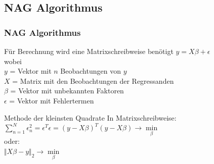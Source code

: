 \documentclass{beamer}
\begin{document}
\subsection{NAG Algorithmus}
\begin{frame}
  \frametitle{NAG Algorithmus}
 
  \begin{block}{Für Berechnung wird eine Matrixschreibweise benötigt}
    {\centering $y = X \beta + \epsilon$ \\}
    wobei \\
    \qquad $y$ = Vektor mit $n$ Beobachtungen von $y$ \\
    \qquad $X$ = Matrix mit den Beobachtungen der Regressanden \\
    \qquad $\beta$ = Vektor mit unbekannten Faktoren \\
    \qquad $\epsilon$ = Vektor mit Fehlertermen \\
  \end{block}
  
  \pause
  
  \begin{block}{Methode der kleinsten Quadrate}
    In Matrixschreibweise:\\
    {\centering
      $\sum\limits^{N}_{n=1} \epsilon^2_n = \epsilon^T \epsilon = (y - X \beta)^T (y - X \beta) \rightarrow \min\limits_{\beta}$\\}
    oder: \\
    {\centering
      $\Vert X\beta - y \Vert_2 \rightarrow \min\limits_{\beta}$
      \\}
  \end{block}

\end{frame}
\end{document}
